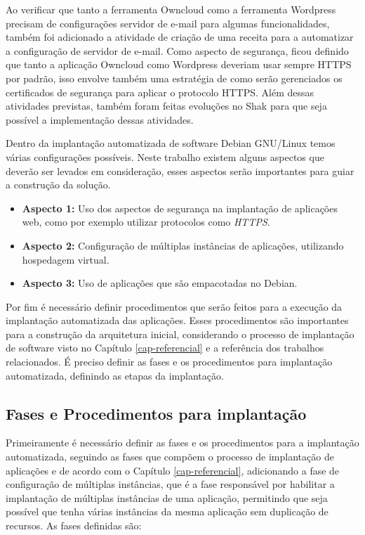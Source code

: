 Ao verificar que tanto a ferramenta Owncloud como a ferramenta Wordpress precisam
de configurações servidor de e-mail para algumas funcionalidades, também foi adicionado
a atividade de criação de uma receita para a automatizar a configuração de
servidor de e-mail. Como aspecto de segurança, ficou definido que tanto a aplicação
Owncloud como Wordpress deveriam usar sempre HTTPS por padrão, isso envolve também
uma estratégia de como serão gerenciados os certificados de segurança para aplicar
o protocolo HTTPS. Além dessas atividades previstas, também foram feitas evoluções
no Shak para que seja possível a implementação dessas atividades.

Dentro da implantação automatizada de software Debian GNU/Linux temos várias
configurações possíveis. Neste trabalho existem alguns aspectos que 
deverão ser levados em consideração, esses aspectos serão importantes para 
guiar a construção da solução.

\begin{itemize}
  \item  \textbf{Aspecto 1:} Uso dos aspectos de segurança na implantação de aplicações web,
   como por exemplo utilizar protocolos como \textit{HTTPS}.
  \item  \textbf{Aspecto 2:} Configuração de múltiplas instâncias de
   aplicações, utilizando hospedagem virtual.
  \item  \textbf{Aspecto 3:} Uso de aplicações que são empacotadas no Debian.
\end{itemize}

Por fim é necessário definir procedimentos que serão
feitos para a execução da implantação automatizada das aplicações. Esses procedimentos são
importantes para a construção da arquitetura inicial, considerando
o processo de implantação de software visto no Capítulo \ref{cap-referencial}
e a referência dos trabalhos relacionados. É preciso definir as fases e os
procedimentos para implantação automatizada, definindo as etapas
da implantação.

\subsection{Fases e Procedimentos para implantação}
\label{sec:fases}

Primeiramente é necessário definir as fases e os procedimentos para a implantação automatizada,
seguindo as fases que compõem o processo de implantação de aplicações e de acordo
com o Capítulo \ref{cap-referencial}, adicionando a fase de configuração de múltiplas
instâncias, que é a fase responsável por habilitar a implantação de múltiplas 
instâncias de uma aplicação, permitindo que seja possível que 
tenha várias instâncias da mesma aplicação sem duplicação de recursos. As fases 
definidas são:

